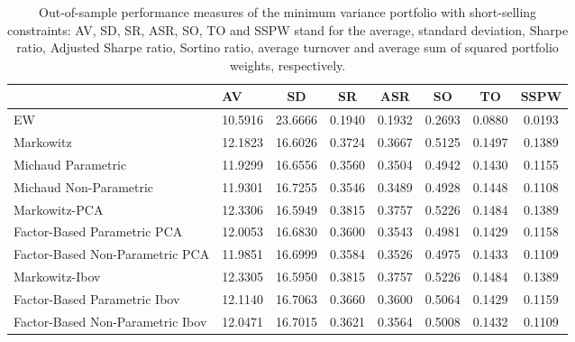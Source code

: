 \begin{table}

\caption{\label{tab:empirical_mvp}Out-of-sample performance measures of the minimum variance portfolio with short-selling constraints: AV, SD, SR, ASR, SO, TO and SSPW stand for the average, standard deviation, Sharpe ratio, Adjusted Sharpe ratio, Sortino ratio, average turnover and average sum of squared portfolio weights, respectively.}
\centering
\begin{tabular}[t]{l|l|c|c|c|c|c|c}
\hline
  & AV & SD & SR & ASR & SO & TO & SSPW\\
\hline
EW & 10.5916 & 23.6666 & 0.1940 & 0.1932 & 0.2693 & 0.0880 & 0.0193\\
\hline
Markowitz & 12.1823 & 16.6026 & 0.3724 & 0.3667 & 0.5125 & 0.1497 & 0.1389\\
\hline
Michaud Parametric & 11.9299 & 16.6556 & 0.3560 & 0.3504 & 0.4942 & 0.1430 & 0.1155\\
\hline
Michaud Non-Parametric & 11.9301 & 16.7255 & 0.3546 & 0.3489 & 0.4928 & 0.1448 & 0.1108\\
\hline
Markowitz-PCA & 12.3306 & 16.5949 & 0.3815 & 0.3757 & 0.5226 & 0.1484 & 0.1389\\
\hline
Factor-Based Parametric PCA & 12.0053 & 16.6830 & 0.3600 & 0.3543 & 0.4981 & 0.1429 & 0.1158\\
\hline
Factor-Based Non-Parametric PCA & 11.9851 & 16.6999 & 0.3584 & 0.3526 & 0.4975 & 0.1433 & 0.1109\\
\hline
Markowitz-Ibov & 12.3305 & 16.5950 & 0.3815 & 0.3757 & 0.5226 & 0.1484 & 0.1389\\
\hline
Factor-Based Parametric Ibov & 12.1140 & 16.7063 & 0.3660 & 0.3600 & 0.5064 & 0.1429 & 0.1159\\
\hline
Factor-Based Non-Parametric Ibov & 12.0471 & 16.7015 & 0.3621 & 0.3564 & 0.5008 & 0.1432 & 0.1109\\
\hline
\end{tabular}
\end{table}
